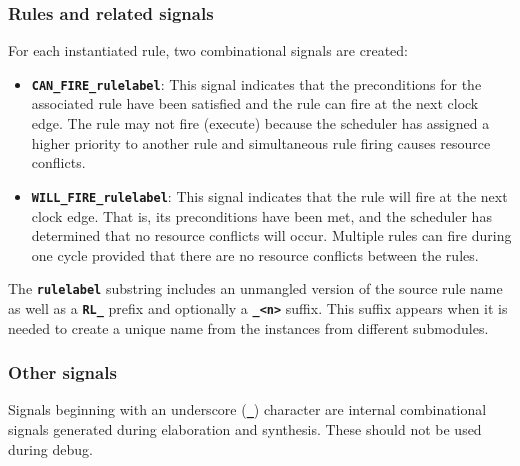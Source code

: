 \documentclass{article}
\newcommand{\tbd}[1]{{\sf TBD: #1}}
\begin{document}

\subsubsection{Rules and related signals}

For each instantiated rule, two combinational signals are created:
\begin{itemize}
\item {\bf\tt CAN\_FIRE\_rulelabel}: This signal indicates that the
  preconditions for the associated rule have been satisfied and the rule
  can fire at the next clock edge. The rule may not fire (execute)
  because the scheduler has assigned a higher priority to another rule
  and simultaneous rule firing causes resource conflicts.
\item {\bf\tt WILL\_FIRE\_rulelabel}: This signal indicates that the
  rule will fire at the next clock edge.  That is, its preconditions
  have been met, and the scheduler has determined that no resource
  conflicts will occur. Multiple rules can fire during one cycle
  provided that there are no resource conflicts between the rules.
\end{itemize}


The {\bf\tt rulelabel} substring includes an unmangled version of the
source rule name as well as a {\bf\tt RL\_} prefix and optionally a
{\bf\tt \_<n>} suffix. This suffix appears when it is needed to create a
unique name from the instances from different submodules.




\subsubsection{Other signals}

Signals beginning with an underscore ({\bf\tt \_}) character are internal
combinational signals generated during elaboration and synthesis. These
should not be used during debug.
\end{document}
